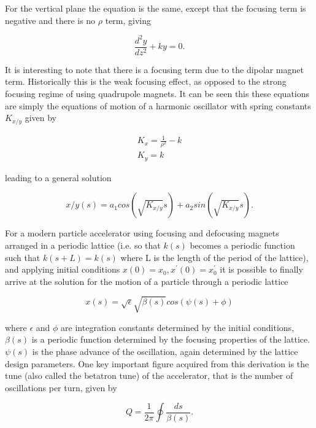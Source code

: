 For the vertical plane the equation is the same, except that the focusing term is negative and there is no $\rho$ term, giving

\begin{equation}
\frac{d^{2}y}{dz^{2}} +  k y  = 0.
\label{eqn:vert-eqn-motion}
\end{equation}

It is interesting to note that there is a focusing term due to the dipolar magnet term. Historically this is the weak focusing effect, as opposed to the strong focusing regime of using quadrupole magnets. It can be seen this these equations are simply the equations of motion of a harmonic oscillator with spring constants $K_{x/y}$ given by

\begin{align*}
K_{x} = \frac{1}{\rho^{2}} - k \\
K_{y} = k
\end{align*}

leading to a general solution 

\begin{equation}
x/y \left( s \right) = a_{1} cos \left( \sqrt{K_{x/y}} s \right) + a_{2} sin \left( \sqrt{K_{x/y}} s \right).
\end{equation}

For a modern particle accelerator using focusing and defocusing magnets arranged in a periodic lattice (i.e. so that $k(s)$ becomes a periodic function such that $k(s+L) = k(s)$ where L is the length of the period of the lattice), and applying initial conditions $x(0) = x_{0}, x^{'}(0) = x^{'}_{0}$ it is possible to finally arrive at the solution for the motion of a particle through a periodic lattice

\begin{equation}
x \left( s \right) = \sqrt{\epsilon} \sqrt{\beta \left( s \right) } cos \left( \psi \left( s \right) + \phi \right)
\end{equation}

where $\epsilon$ and $\phi$ are integration constants determined by the initial conditions, $\beta (s)$ is a periodic function determined by the focusing properties of the lattice. $ \psi (s)$ is the phase advance of the oscillation, again determined by the lattice design parameters. One key important figure acquired from this derivation is the tune (also called the betatron tune) of the accelerator, that is the number of oscillations per turn, given by

\begin{equation}
Q = \frac{1}{2\pi} \oint \frac{ds}{\beta \left( s \right)}.
\end{equation}

